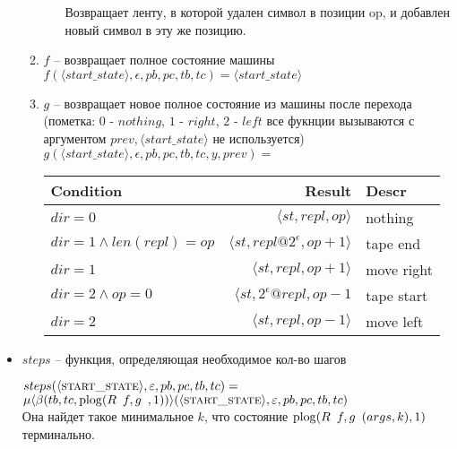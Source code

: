 \begin{itemize}
\begin{enumerate}
\begin{itemize}
Возвращает ленту, в которой удален символ в позиции op, и добавлен новый символ в эту же позицию.
\end{itemize}
\item $f$ -- возвращает полное состояние машины\\
$f(\langle start\_state \rangle, \epsilon , pb, pc, tb, tc) = \langle start\_state \rangle$
\item $g$ -- возвращает новое полное состояние из машины после перехода (пометка: $0$ - $nothing$, $1$ - $right$, $2$ - $left$ все фукнции вызываются с аргументом $prev, \langle start\_state \rangle$ не используется)\\
$g(\langle start\_state \rangle, \epsilon , pb, pc, tb, tc, y, prev) =$
\begin{center}
\begin{tabular}{lrl}
Condition & Result & Descr\\
\hline
$dir = 0$        & $\langle st, repl, op \rangle$ & nothing\\
$dir = 1 \land len(repl) = op$ & $\langle st, repl @ 2^{\epsilon}, op + 1 \rangle$ & tape end\\
$dir = 1$        & $\langle st, repl, op + 1 \rangle$ & move right\\
$dir = 2 \land op = 0$    & $\langle st, 2^{\epsilon} @ repl, op - 1$ & tape start\\
$dir = 2$      & $\langle st, repl, op - 1 \rangle$ & move left\\
\hline
\end{tabular}
\end{center}
\end{enumerate}
\item $steps$ -- функция, определяющая необходимое кол-во шагов

$steps(\langle \textnormal{\scshape start\_state} \rangle, \varepsilon , pb, pc, tb, tc) =$\\
$\mu \langle \beta(tb, tc, \plog(R\template{f, g}, 1))\rangle (\langle \const{start\_state} \rangle, \epsilon , pb, pc, tb, tc)$\\
Она найдет такое минимальное $k$, что состояние $\plog(R\template{f, g}(args, k), 1)$ терминально.
\end{itemize}
